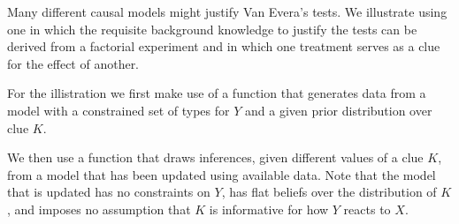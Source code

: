 \documentclass[
  12pt,
]{book}
\newenvironment{Shaded}{\begin{snugshade}}{\end{snugshade}}
\newcommand{\ControlFlowTok}[1]{\textcolor[rgb]{0.13,0.29,0.53}{\textbf{#1}}}
\newcommand{\DataTypeTok}[1]{\textcolor[rgb]{0.13,0.29,0.53}{#1}}
\newcommand{\DecValTok}[1]{\textcolor[rgb]{0.00,0.00,0.81}{#1}}
\newcommand{\KeywordTok}[1]{\textcolor[rgb]{0.13,0.29,0.53}{\textbf{#1}}}
\newcommand{\NormalTok}[1]{#1}
\newcommand{\OperatorTok}[1]{\textcolor[rgb]{0.81,0.36,0.00}{\textbf{#1}}}
\newcommand{\OtherTok}[1]{\textcolor[rgb]{0.56,0.35,0.01}{#1}}
\newcommand{\StringTok}[1]{\textcolor[rgb]{0.31,0.60,0.02}{#1}}
\begin{document}
Many different causal models might justify Van Evera's tests. We illustrate using one in which the requisite background knowledge to justify the tests can be derived from a factorial experiment and in which one treatment serves as a clue for the effect of another.

For the illistration we first make use of a function that generates data from a model with a constrained set of types for \(Y\) and a given prior distribution over clue \(K\).

\begin{Shaded}
\end{Shaded}

We then use a function that draws inferences, given different values of a clue \(K\), from a model that has been updated using available data. Note that the model that is updated has no constraints on \(Y\), has flat beliefs over the distribution of \(K\), and imposes no assumption that \(K\) is informative for how \(Y\) reacts to \(X\).

\begin{Shaded}
\end{Shaded}
\end{document}
